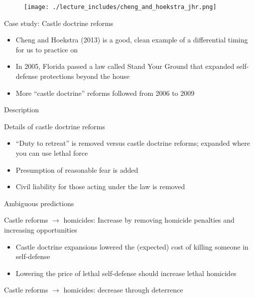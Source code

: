 \documentclass{beamer}
\begin{document}
\begin{frame}[plain]
	\begin{figure}
	\texttt{[image: ./lecture\_includes/cheng\_and\_hoekstra\_jhr.png]}
	\end{figure}

\end{frame}

\begin{frame}{Case study: Castle doctrine reforms}

\begin{itemize}

\item Cheng and Hoekstra (2013) is a good, clean example of a differential timing for us to practice on
\item In 2005, Florida passed a law called Stand Your Ground that expanded self-defense protections beyond the house
\item More ``castle doctrine'' reforms followed from 2006 to 2009

\end{itemize}

\end{frame}

\begin{frame}{Description}

Details of castle doctrine reforms
		\begin{itemize}
		\item ``Duty to retreat'' is removed versus castle doctrine reforms; expanded where you can use lethal force
		\item Presumption of reasonable fear is added
		\item Civil liability for those acting under the law is removed
		\end{itemize}
\end{frame}

\begin{frame}{Ambiguous predictions}
	
Castle reforms $\rightarrow$ homicides: Increase by removing homicide penalties and increasing opportunities
	\begin{itemize}
	\item Castle doctrine expansions lowered the (expected) cost of killing someone in self-defense
	\item Lowering the price of lethal self-defense should increase lethal homicides
	\end{itemize}
\bigskip
Castle reforms $\rightarrow$ homicides: decrease through deterrence

\end{frame}
\end{document}
